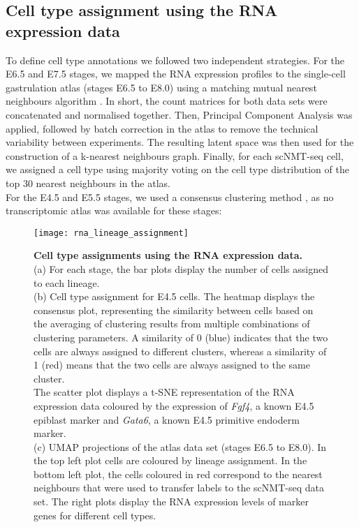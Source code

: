 \subsection{Cell type assignment using the RNA expression data}

To define cell type annotations we followed two independent strategies. For the E6.5 and E7.5 stages, we mapped the RNA expression profiles to the single-cell gastrulation atlas \cite{Pijuan-Sala2019} (stages E6.5 to E8.0) using a matching mutual nearest neighbours algorithm \cite{Haghverdi2018}. In short, the count matrices for both data sets were concatenated and normalised together. Then, Principal Component Analysis was applied, followed by batch correction in the atlas to remove the technical variability between experiments. The resulting latent space was then used for the construction of a k-nearest neighbours graph. Finally, for each scNMT-seq cell, we assigned a cell type using majority voting on the cell type distribution of the top 30 nearest neighbours in the atlas.\\
For the E4.5 and E5.5 stages, we used a consensus clustering method \cite{Kiselev2017}, as no transcriptomic atlas was available for these stages:

\begin{figure}[H]
	\centering
	\texttt{[image: rna\_lineage\_assignment]}
	\caption[]{
	\textbf{Cell type assignments using the RNA expression data.} \\
	(a) For each stage, the bar plots display the number of cells assigned to each lineage.\\
	(b) Cell type assignment for E4.5 cells. The heatmap displays the consensus plot, representing the similarity between cells based on the averaging of clustering results from multiple combinations of clustering parameters\cite{Kiselev2017}. A similarity of 0 (blue) indicates that the two cells are always assigned to different clusters, whereas a similarity of 1 (red) means that the two cells are always assigned to the same cluster.\\
	The scatter plot displays a t-SNE representation of the RNA expression data coloured by the expression of \textit{Fgf4}, a known E4.5 epiblast marker and \textit{Gata6}, a known E4.5 primitive endoderm marker.\\
	(c) UMAP projections of the atlas data set (stages E6.5 to E8.0). In the top left plot cells are coloured by lineage assignment. In the bottom left plot, the cells coloured in red correspond to the nearest neighbours that were used to transfer labels to the scNMT-seq data set. The right plots display the RNA expression levels of marker genes for different cell types.
	}
	\label{fig:lineage_assignment}
\end{figure}


